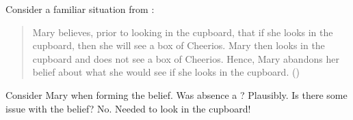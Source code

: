 \begin{note}
  Consider a familiar situation from \citeauthor{Harman:1986ux}:

  \begin{quote}
    Mary believes, prior to looking in the cupboard, that if she looks in the cupboard, then she will see a box of Cheerios.
    Mary then looks in the cupboard and does not see a box of Cheerios.
    Hence, Mary abandons her belief about what she would see if she looks in the cupboard.\nolinebreak
    \mbox{}\hfill\mbox{(\citeyear[Cf.][Chs.1\&2]{Harman:1986ux})}
  \end{quote}

  Consider Mary when forming the belief.
  Was absence a \requ{}?
  Plausibly.
  Is there some issue with the belief?
  No.
  Needed to look in the cupboard!
\end{note}


